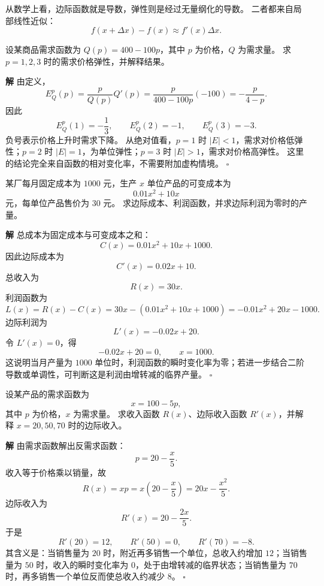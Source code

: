 \documentclass[fontset=fandol]{ctexart}
\newenvironment{solution}{\par\noindent\textbf{解}\quad}{\hfill$\square$\par\vspace{0.8em}}
\begin{document}
从数学上看，边际函数就是导数，弹性则是经过无量纲化的导数。 二者都来自局部线性近似：
\[
f(x+\Delta x)-f(x)\approx f'(x)\Delta x.
\]

\begin{example}[需求价格弹性]
设某商品需求函数为 $Q(p)=400-100p$，其中 $p$ 为价格，$Q$ 为需求量。 求 $p=1,2,3$ 时的需求价格弹性，并解释结果。
\end{example}
\begin{solution}
由定义，
\[
E_Q^p(p)=\frac{p}{Q(p)}Q'(p)=\frac{p}{400-100p}(-100)=-\frac{p}{4-p}.
\]
因此
\[
E_Q^p(1)=-\frac13,\qquad E_Q^p(2)=-1,\qquad E_Q^p(3)=-3.
\]
负号表示价格上升时需求下降。 从绝对值看，$p=1$ 时 $|E|<1$，需求对价格低弹性；$p=2$ 时 $|E|=1$，为单位弹性；$p=3$ 时 $|E|>1$，需求对价格高弹性。 这里的结论完全来自函数的相对变化率，不需要附加虚构情境。
\end{solution}

\begin{example}
某厂每月固定成本为 $1000$ 元，生产 $x$ 单位产品的可变成本为
\[
0.01x^2+10x
\]
元，每单位产品售价为 $30$ 元。 求边际成本、利润函数，并求边际利润为零时的产量。
\end{example}
\begin{solution}
总成本为固定成本与可变成本之和：
\[
C(x)=0.01x^2+10x+1000.
\]
因此边际成本为
\[
C'(x)=0.02x+10.
\]
总收入为
\[
R(x)=30x.
\]
利润函数为
\[
L(x)=R(x)-C(x)=30x-(0.01x^2+10x+1000)
=-0.01x^2+20x-1000.
\]
边际利润为
\[
L'(x)=-0.02x+20.
\]
令 $L'(x)=0$，得
\[
-0.02x+20=0,\qquad x=1000.
\]
这说明当月产量为 $1000$ 单位时，利润函数的瞬时变化率为零；若进一步结合二阶导数或单调性，可判断这是利润由增转减的临界产量。
\end{solution}

\begin{example}[需求函数与边际收入]
设某产品的需求函数为
\[
x=100-5p,
\]
其中 $p$ 为价格，$x$ 为需求量。 求收入函数 $R(x)$、边际收入函数 $R'(x)$，并解释 $x=20,50,70$ 时的边际收入。
\end{example}
\begin{solution}
由需求函数解出反需求函数：
\[
p=20-\frac{x}{5}.
\]
收入等于价格乘以销量，故
\[
R(x)=xp=x\left(20-\frac{x}{5}\right)=20x-\frac{x^2}{5}.
\]
边际收入为
\[
R'(x)=20-\frac{2x}{5}.
\]
于是
\[
R'(20)=12,\qquad R'(50)=0,\qquad R'(70)=-8.
\]
其含义是：当销售量为 $20$ 时，附近再多销售一个单位，总收入约增加 $12$；当销售量为 $50$ 时，收入的瞬时变化率为 $0$，处于由增转减的临界状态；当销售量为 $70$ 时，再多销售一个单位反而使总收入约减少 $8$。
\end{solution}
\end{document}
